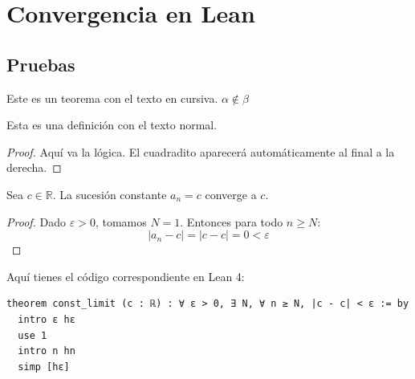 \chapter{Convergencia en Lean}

\section{Pruebas}

\begin{teorema}
  Este es un teorema con el texto en cursiva. $\alpha \notin  \beta$
\end{teorema}

\begin{definicion}
Esta es una definición con el texto normal.
\end{definicion}

\begin{proof}
Aquí va la lógica. El cuadradito aparecerá automáticamente al final a la derecha.
\end{proof}

\begin{teorema}
Sea $c \in \mathbb{R}$. La sucesión constante $a_n = c$ converge a $c$.
\end{teorema}

\begin{proof}
Dado $\varepsilon > 0$, tomamos $N = 1$. Entonces para todo $n \geq N$:
\[ |a_n - c| = |c - c| = 0 < \varepsilon \]
\end{proof}

Aquí tienes el código correspondiente en Lean 4:

\begin{verbatim}
theorem const_limit (c : ℝ) : ∀ ε > 0, ∃ N, ∀ n ≥ N, |c - c| < ε := by
  intro ε hε
  use 1
  intro n hn
  simp [hε]
\end{verbatim}


